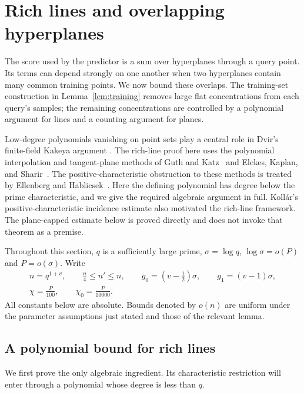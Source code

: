 \section{Rich lines and overlapping hyperplanes}\label{sec:geometry}

The score used by the predictor is a sum over hyperplanes through a query
point.  Its terms can depend strongly on one another when two hyperplanes
contain many common training points.  We now bound these overlaps.  The
training-set construction in Lemma~\ref{lem:training} removes large flat
concentrations from each query's samples; the remaining concentrations are
controlled by a polynomial argument for lines and a counting argument for
planes.

Low-degree polynomials vanishing on point sets play a central role in
Dvir's finite-field Kakeya argument \cite{Dvir2009}.
The rich-line proof here uses the polynomial interpolation and tangent-plane
methods of Guth and Katz~\cite{GuthKatz2010} and Elekes, Kaplan, and
Sharir~\cite{ElekesKaplanSharir2011}.  The positive-characteristic
obstruction to these methods is treated by Ellenberg and
Hablicsek~\cite{EllenbergHablicsek2016}.  Here the defining polynomial
has degree below the prime characteristic, and we give the required
algebraic argument in full.
Koll\'ar's positive-characteristic incidence estimate
\cite[Theorem~2]{Kollar} also motivated the rich-line framework. The
plane-capped estimate below is proved directly and does not invoke that
theorem as a premise.

Throughout this section, $q$ is a sufficiently large prime,
$\sigma=\log q$, $\log\sigma=o(P)$ and $P=o(\sigma)$.  Write
\[
 \begin{gathered}
 n=q^{1+v},\qquad \frac n4\le n'\le n,\qquad
 g_0=(v-\tfrac12)\sigma,\qquad g_1=(v-1)\sigma,\\
 \chi=\frac P{100},\qquad \chi_0=\frac P{10000}.
 \end{gathered}
\]
All constants below are absolute.  Bounds denoted by $o(n)$ are uniform
under the parameter assumptions just stated and those of the relevant
lemma.

\subsection{A polynomial bound for rich lines}

We first prove the only algebraic ingredient.  Its characteristic
restriction will enter through a polynomial whose degree is less than $q$.

